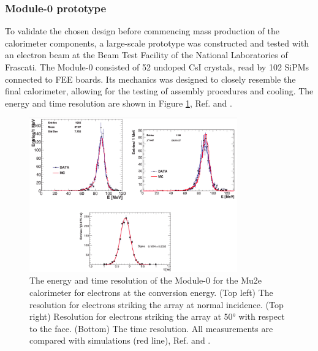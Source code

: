 \subsubsection{Module-0 prototype}
To validate the chosen design before commencing mass production of 
the calorimeter components, a large-scale prototype was constructed and 
tested with an electron beam at the Beam Test Facility of the National 
Laboratories of Frascati. The Module-0 consisted of 52 undoped CsI crystals, 
read by 102 SiPMs connected to FEE boards. Its mechanics was designed 
to closely resemble the final calorimeter, allowing for the testing 
of assembly procedures and cooling.
The energy and time resolution are
shown in Figure \ref{fig:calores}, Ref. \cite{bobbb} and \cite{calo95}.
\begin{figure}[!h]
    \centering
    \includegraphics[width =0.8\textwidth]{figures/png/Screenshot_20240330_105520.png}
    \caption[The energy and time resolution of the calorimeter Module-0.]{The 
    energy and time resolution of the Module-0 for the Mu2e 
    calorimeter for electrons at the conversion energy. (Top left) The resolution 
    for electrons striking the array at normal incidence. (Top right) 
    Resolution for electrons striking the array at 50° with respect to the 
    face. (Bottom) The time resolution. All measurements are compared with 
    simulations (red line), Ref. \cite{bobbb} and \cite{calo95}.}
    \label{fig:calores}
\end{figure}
